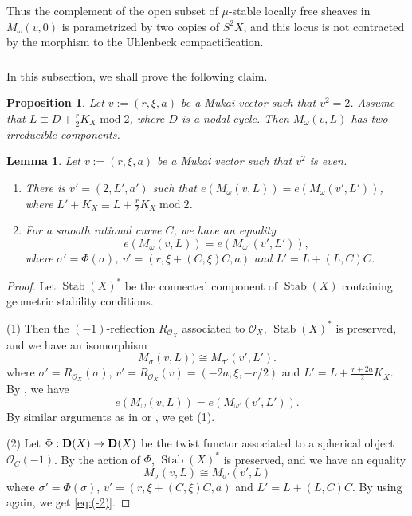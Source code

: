 \documentclass[leqno,11pt]{amsart}
\def\mod{\mathop{\mathrm{mod}}\nolimits}
\def\Stab{\mathop{\mathrm{Stab}}}
\newtheorem{Prop}[Thm]{Proposition}
\newtheorem{Lem}[Thm]{Lemma}
\theoremstyle{definition}
\def\OO{\ensuremath{\mathcal O}}
\begin{document}
Thus the complement of the open subset of $\mu$-stable locally free sheaves
in $M_\omega(v,0)$ is parametrized by
two copies of $S^2 X$, and this locus is not contracted by the
morphism to the Uhlenbeck compactification.
 



\subsubsection{}



In this subsection, we shall prove the following claim. 
\begin{Prop}\label{prop:irred-comp:v^2=2}
Let $v:=(r,\xi,a)$ be a Mukai vector such that $v^2=2$.
Assume that $L \equiv D+\frac{r}{2}K_X \mod 2$, where $D$ is a nodal cycle.
Then $M_\omega(v,L)$ has two irreducible components.
\end{Prop}



\begin{Lem}\label{lem:e-poly}
Let $v:=(r,\xi,a)$ be a Mukai vector such that $v^2$ is even.
\begin{enumerate}
\item[(1)]
There is $v'=(2,L',a')$ such that
$e(M_\omega(v,L))=e(M_\omega(v',L'))$,
where $L'+K_X \equiv L+\frac{r}{2}K_X \mod 2$.
\item[(2)]
For a smooth rational curve $C$,
we have an equality
\begin{equation}\label{eq:(-2)}
e(M_\omega(v,L))= e(M_{\omega'}(v',L')),
\end{equation}
where $\sigma'=\Phi(\sigma)$, 
$v'=(r,\xi+(C,\xi)C,a)$ and $L'=L+(L,C)C$.
\end{enumerate}
\end{Lem}

\begin{proof}
Let $\Stab(X)^*$ be the connected component of $\Stab(X)$
containing geometric stability conditions.

(1)
Then the $(-1)$-reflection $R_{\OO_X}$ associated to
$\OO_X$, $\Stab(X)^*$ is preserved, and
we have an isomorphism
\begin{equation}
M_\sigma(v,L))\cong M_{\sigma'}(v',L').
\end{equation}
where $\sigma'=R_{\OO_X}(\sigma)$, 
$v'=R_{\OO_X}(v)=(-2a,\xi,-r/2)$ 
and $L'=L+\tfrac{r+2a}{2}K_X$.
By \cite{Nue14a},
we have
\begin{equation}
e(M_\omega(v,L))= e(M_{\omega'}(v',L')).
\end{equation}
By similar arguments as in \cite{Nue14a} or \cite{Yos16a},
we get (1).

(2)
Let $\Phi:{\bf D}(X) \to {\bf D}(X)$ be the twist functor
associated to a spherical object $\OO_C(-1)$.
By the action of $\Phi$,
$\Stab(X)^*$ is preserved, and
we have an equality
\begin{equation}
M_\sigma(v,L) \cong M_{\sigma'}(v',L)
\end{equation}
where $\sigma'=\Phi(\sigma)$, 
$v'=(r,\xi+(C,\xi)C,a)$ and $L'=L+(L,C)C$.
By using \cite{Nue14a} again,
we get \eqref{eq:(-2)}.
\end{proof}
\end{document}
